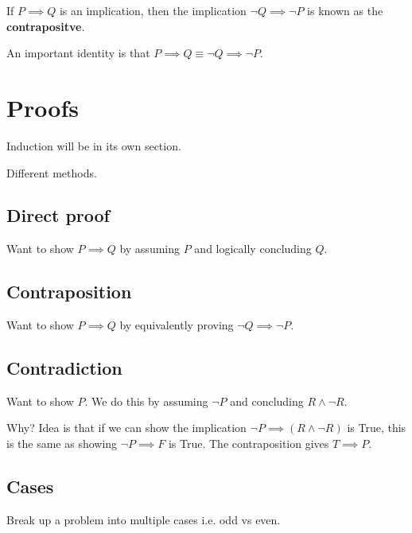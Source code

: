 \begin{definition}[Contrapositive]
    If $P \implies Q$ is an implication, then the implication $\neg Q \implies \neg P$ is known as the \textbf{contrapositve}.
\end{definition}

An important identity is that $P \implies Q \equiv \neg Q \implies \neg P$. 

\section{Proofs}
Induction will be in its own section.

Different methods. 

\subsection{Direct proof}
Want to show $P \implies Q$ by assuming $P$ and logically concluding $Q$. 

\subsection{Contraposition}
Want to show $P \implies Q$ by equivalently proving $\neg Q \implies \neg P$. 

\subsection{Contradiction}
Want to show $P$. We do this by assuming $\neg P$ and concluding $R \land \neg R$. 

Why? Idea is that if we can show the implication $\neg P \implies (R \land \neg R)$ is True, this is the same as showing $\neg P \implies F$ is True. The contraposition gives $T \implies P$. 

\subsection{Cases}
Break up a problem into multiple cases i.e. odd vs even. 
